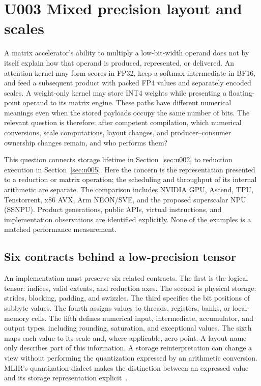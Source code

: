 \section{U003 Mixed precision layout and scales}
\label{sec:u003}

A matrix accelerator's ability to multiply a low-bit-width operand does not by itself explain how that operand is produced, represented, or delivered. An attention kernel may form scores in FP32, keep a softmax intermediate in BF16, and feed a subsequent product with packed FP4 values and separately encoded scales. A weight-only kernel may store INT4 weights while presenting a floating-point operand to its matrix engine. These paths have different numerical meanings even when the stored payloads occupy the same number of bits. The relevant question is therefore: after competent compilation, which numerical conversions, scale computations, layout changes, and producer--consumer ownership changes remain, and who performs them?

This question connects storage lifetime in Section~\ref{sec:u002} to reduction execution in Section~\ref{sec:u005}. Here the concern is the representation presented to a reduction or matrix operation; the scheduling and throughput of its internal arithmetic are separate. The comparison includes NVIDIA GPU, Ascend, TPU, Tenstorrent, x86 AVX, Arm NEON/SVE, and the proposed superscalar NPU (SSNPU). Product generations, public APIs, virtual instructions, and implementation observations are identified explicitly. None of the examples is a matched performance measurement.

\subsection{Six contracts behind a low-precision tensor}

An implementation must preserve six related contracts. The first is the logical tensor: indices, valid extents, and reduction axes. The second is physical storage: strides, blocking, padding, and swizzles. The third specifies the bit positions of subbyte values. The fourth assigns values to threads, registers, banks, or local-memory cells. The fifth defines numerical input, intermediate, accumulator, and output types, including rounding, saturation, and exceptional values. The sixth maps each value to its scale and, where applicable, zero point. A layout name only describes part of this information. A storage reinterpretation can change a view without performing the quantization expressed by an arithmetic conversion. MLIR's quantization dialect makes the distinction between an expressed value and its storage representation explicit~\citep{u003_mlir_quant}.

